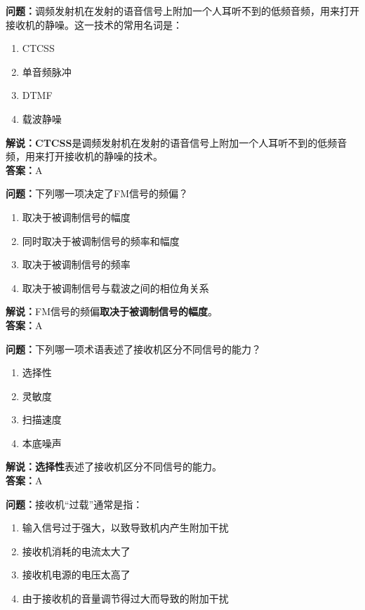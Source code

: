 \textbf{问题：}调频发射机在发射的语音信号上附加一个人耳听不到的低频音频，用来打开接收机的静噪。这一技术的常用名词是：

\begin{enumerate}[label=\Alph*), leftmargin=1cm]
	\item CTCSS
	\item 单音频脉冲
	\item DTMF
	\item 载波静噪
\end{enumerate}

\textbf{解说：}\textbf{CTCSS}是调频发射机在发射的语音信号上附加一个人耳听不到的低频音频，用来打开接收机的静噪的技术。\\\textbf{答案：}A%



\textbf{问题：}下列哪一项决定了FM信号的频偏？

\begin{enumerate}[label=\Alph*), leftmargin=1cm]
	\item 取决于被调制信号的幅度
	\item 同时取决于被调制信号的频率和幅度
	\item 取决于被调制信号的频率
	\item 取决于被调制信号与载波之间的相位角关系
\end{enumerate}

\textbf{解说：}FM信号的频偏\textbf{取决于被调制信号的幅度}。\\\textbf{答案：}A%



\textbf{问题：}下列哪一项术语表述了接收机区分不同信号的能力？

\begin{enumerate}[label=\Alph*), leftmargin=1cm]
	\item 选择性
	\item 灵敏度
	\item 扫描速度
	\item 本底噪声
\end{enumerate}

\textbf{解说：}\textbf{选择性}表述了接收机区分不同信号的能力。\\\textbf{答案：}A%



\textbf{问题：}接收机“过载”通常是指：

\begin{enumerate}[label=\Alph*), leftmargin=1cm]
	\item 输入信号过于强大，以致导致机内产生附加干扰
	\item 接收机消耗的电流太大了
	\item 接收机电源的电压太高了
	\item 由于接收机的音量调节得过大而导致的附加干扰
\end{enumerate}


